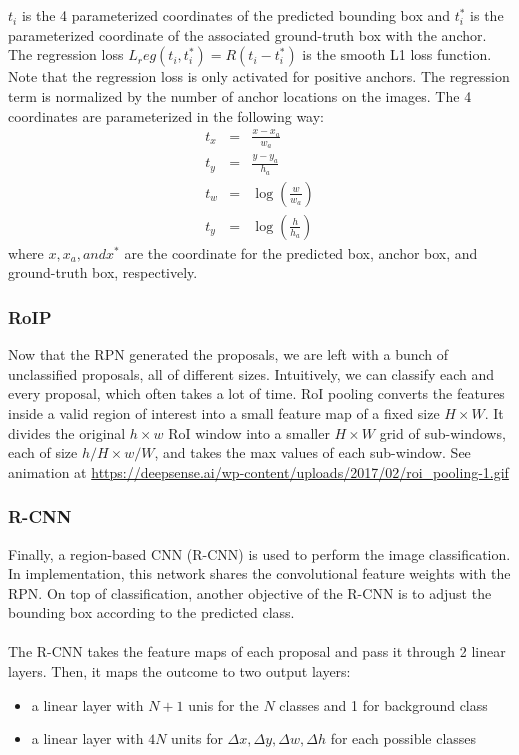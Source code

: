 \documentclass[12pt]{article}
\begin{document}
	\\\\
	$t_i$ is the 4 parameterized coordinates of the predicted bounding box and $t_i^*$ is the parameterized coordinate of the associated ground-truth box with the anchor. The regression loss $L_reg(t_i, t_i^*)=R(t_i-t_i^*)$ is the smooth L1 loss function. Note that the regression loss is only activated for positive anchors. The regression term is normalized by the number of anchor locations on the images. The 4 coordinates are parameterized in the following way:
	\begin{eqnarray*}
		t_x &=& \frac{x-x_a}{w_a}\\
		t_y &=& \frac{y-y_a}{h_a}\\
		t_w &=& \log(\frac{w}{w_a})\\
		t_y &=& \log(\frac{h}{h_a})
	\end{eqnarray*}
	where $x, x_a, and x^*$ are the coordinate for the predicted box, anchor box, and ground-truth box, respectively.

	\subsubsection*{RoIP}
	Now that the RPN generated the proposals, we are left with a bunch of unclassified proposals, all of different sizes. Intuitively, we can classify each and every proposal, which often takes a lot of time. RoI pooling converts the features inside a valid region of interest into a small feature map of a fixed size $H\times W$. It divides the original $h\times w$ RoI window into a smaller $H\times W$ grid of sub-windows, each of size $h/H \times w/W$, and takes the max values of each sub-window. See animation at \url{https://deepsense.ai/wp-content/uploads/2017/02/roi_pooling-1.gif}
	
	\subsubsection*{R-CNN}
	Finally, a region-based CNN (R-CNN) is used to perform the image classification. In implementation, this network shares the convolutional feature weights with the RPN. On top of classification, another objective of the R-CNN is to adjust the bounding box according to the predicted class.\\
	\\
	The R-CNN takes the feature maps of each proposal and pass it through 2 linear layers. Then, it maps the outcome to two output layers:
	\begin{itemize}
		\item a linear layer with $N+1$ unis for the $N$ classes and 1 for background class
		\item a linear layer with $4N$ units for $\Delta x, \Delta y, \Delta w, \Delta h$ for each possible classes
	\end{itemize}
\end{document}
